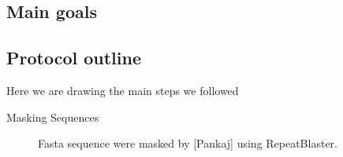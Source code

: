 \documentclass[11pt]{article}
\newcommand{\subsctn}[1]{\subsection{#1}}
\begin{document}
\subsctn{Main goals}

\subsctn{Protocol outline}

Here we are drawing the main steps we followed 

\begin{description}
 \item[Masking Sequences] 

    Fasta sequence were masked by [Pankaj] using RepeatBlaster.

\begin{comment}
+ RepeatMasker:

  Smit, AFA \& Green, P. 
  RepeatMasker at \url|http://ftp.genome.washington.edu/RM/RepeatMasker.html|

+ MaskerAid:

  Bedell JA, Korf I, Gish W.
  ``MaskerAid: a performance enhancement to RepeatMasker.''
  Bioinformatics 2000 Nov; 16(11):1040-1

  ABSTRACT: Identifying and masking repetitive elements is usually the
  first step when analyzing vertebrate genomic sequence. Current
  repeat identification software is sensitive but slow, creating a
  costly bottleneck in large-scale analyses. We have developed
  MaskerAid, a software enhancement to RepeatMasker that increased the
  speed of masking more than 30-fold at the most sensitive setting.

  Abstract URL: \url|http://bioinformatics.oupjournals.org/cgi/content/abstract/16/11/1040|

  \url|http://sapiens.wustl.edu/MaskerAid/|

+ Tandem Repeats Finder:

  G. Benson,
  ``Tandem repeats finder: a program to analyze DNA sequences.''
  Nucleic Acids Research (1999) Vol. 27, No. 2, pp. 573-580.

  ABSTRACT: A tandem repeat in DNA is two or more contiguous,
  approximate copies of a pattern of nucleotides. Tandem repeats have
  been shown to cause human disease, may play a variety of regulatory
  and evolutionary roles and are important laboratory and analytic
  tools. Extensive knowledge about pattern size, copy number,
  mutational history, etc. for tandem repeats has been limited by the
  inability to easily detect them in genomic sequence data. In this
  paper, we present a new algorithm for finding tandem repeats which
  works without the need to specify either the pattern or pattern
  size. We model tandem repeats by percent identity and frequency of
  indels between adjacent pattern copies and use statistically based
  recognition criteria. We demonstrate the algorithm's speed and its
  ability to detect tandem repeats that have undergone extensive
  mutational change by analyzing four sequences: the human frataxin
  gene, the human beta T cellreceptor locus sequence and two yeast
  chromosomes. These sequences range in size from 3 kb up to 700 kb. A
  World Wide Web server interface atc3.biomath.mssm.edu/trf.html has
  been established for automated use of the program.


\end{comment}
\end{description}
\end{document}
